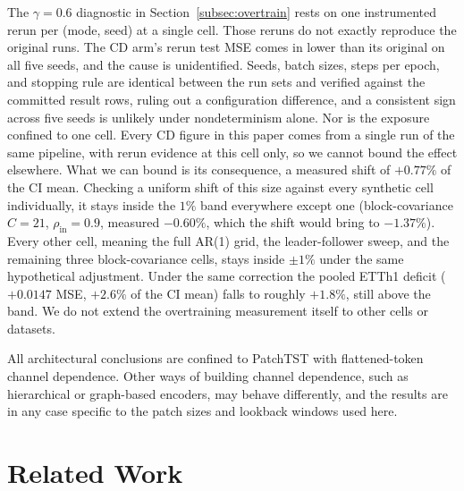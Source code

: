 \documentclass[10pt]{article} %
\begin{document}
    The $\gamma = 0.6$ diagnostic in Section~\ref{subsec:overtrain} rests on one instrumented rerun per (mode, seed) at a
    single cell. Those reruns do not exactly reproduce the original runs. The CD arm's rerun test MSE comes in lower than its
    original on all five seeds, and the cause is unidentified. Seeds, batch sizes, steps per epoch, and stopping rule are
    identical between the run sets and verified against the committed result rows, ruling out a configuration difference,
    and a consistent sign across five seeds is unlikely under nondeterminism alone. Nor is the exposure confined to
    one cell. Every CD figure in this paper comes from a single run of the same pipeline, with rerun evidence at this cell
    only, so we cannot bound the effect elsewhere. What we can bound is its consequence, a measured shift of $+0.77\%$
    of the CI mean. Checking a uniform shift of this size against every synthetic cell individually, it stays inside the
    $1\%$ band everywhere except one (block-covariance $C = 21$, $\rho_{\mathrm{in}} = 0.9$, measured $-0.60\%$, which the
    shift would bring to $-1.37\%$). Every other cell, meaning the full AR(1) grid, the leader-follower sweep, and the remaining
    three block-covariance cells, stays inside $\pm 1\%$ under the same hypothetical adjustment. Under the same
    correction the pooled ETTh1 deficit ($+0.0147$ MSE, $+2.6\%$ of the CI mean) falls to roughly $+1.8\%$, still above
    the band. We do not extend the overtraining measurement itself to other cells or datasets.

    All architectural conclusions are confined to PatchTST with flattened-token channel dependence. Other ways of building
    channel dependence, such as hierarchical or graph-based encoders, may behave differently, and the results are in any
    case specific to the patch sizes and lookback windows used here.


   \section{Related Work}
    \label{sec:related_work}
\end{document}
